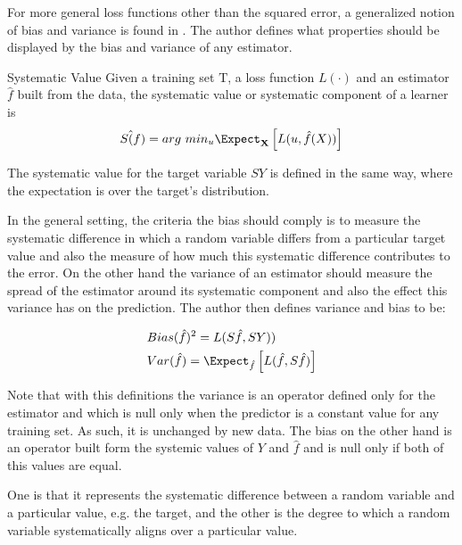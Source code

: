  For more general loss functions other than the squared error, a generalized notion of bias and variance is found in \cite{james-biasVarianceGeneral}. The author defines what properties should be displayed by the bias and variance of any estimator. 
 \begin{definition}{Systematic Value}
 	Given a training set $\mathrm{T}$, a loss function $L(\cdot)$ and an estimator $\hat{f}$ built from the data, the systematic value or systematic component of a learner is 
 	$$ S\hat(f)  =  arg \ min_u \Expect_{\textbf{X}} \left[ L(u,\hat{f}(X)) \right]$$
 \end{definition}
 
 The systematic value for the target variable $SY$ is defined in the same way, where the expectation is over the target's distribution. 
 
 In the general setting, the criteria the bias should comply is to measure the systematic difference in which a random variable differs from a particular target value and also the measure of how much this systematic difference contributes to the error. On the other hand the variance of an estimator should measure the spread of the estimator around its systematic component and also the effect this variance has on the prediction. The author then defines variance and bias to be:
 
 \begin{equation}
 \begin{split}
 & Bias(\hat{f})^2 = L(S\hat{f},SY)) \\
 & Var(\hat{f}) = \Expect_{\hat{f}} \left[  L(\hat{f}  , S\hat{f}) \right]
 \end{split}
 \end{equation}
 
 Note that with this definitions the variance is an operator defined only for the estimator and which is null only when the predictor is a constant value for any training set. As such, it is unchanged by new data. The bias on the other hand is an operator built form the systemic values of $Y$ and $\hat{f}$ and is null only if both of this values are equal.
 
 One is that it represents the systematic difference between a random
 variable and a particular value, e.g. the target, and the other is the degree to which a random variable systematically aligns over a particular value.
 
 
